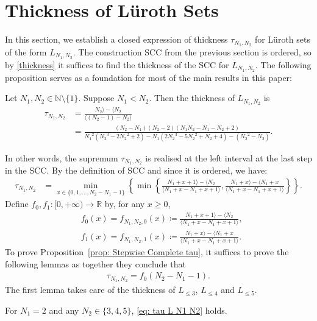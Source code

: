 \documentclass{ws-ijnt}
\begin{document}
	\section{Thickness of L\"uroth Sets}\label{section: thickness}
	In this section, we establish a closed expression of thickness $\tau_{N_1,N_2}$ for L\"uroth sets of the form $L_{N_1,N_2}$. The construction SCC from the previous section is ordered, so by \eqref{thickness} it suffices to find the thickness of the SCC for $L_{N_1,N_2}$. The following proposition serves as a foundation for most of the main results in this paper:
	\begin{proposition}\label{prop: Stepwise Complete tau}
		Let $N_1,N_2\in\mathbb{N}\setminus\{1\}$. Suppose $N_1<N_2$. Then the thickness of $L_{N_1,N_2}$ is
		\begin{align}
			\label{eq: tau L N1 N2}
			\tau_{N_1,N_2}
			&=\frac{N_2\rangle-\langle N_2}{\langle(N_2-1)-N_2\rangle} \\
			&=\frac{(N_2-N_1)(N_2-2)(N_1N_2-N_1-N_2+2)}{{N_1}^2({N_2}^3-2{N_2}^2+2)-{N_1}(2{N_2}^3-5{N_2}^2+{N_2}+4)-({N_2}^2-{N_2})} \nonumber
			.
		\end{align}
	\end{proposition}
	In other words, the supremum $\tau_{N_1,N_2}$ is realised at the left interval at the last step in the SCC. By the definition of SCC and since it is ordered, we have:
	\begin{align*}
		\tau_{N_1,N_2}
		&=\min_{x\in\{0,1,\ldots,N_2-N_1-1\}}{\left\{\min{\left\{
				\frac{N_1+x+1\rangle-\langle N_2}{\langle N_1+x-N_1+x+1\rangle}
				,
				\frac{N_1+x\rangle-\langle N_1+x}{\langle N_1+x-N_1+x+1\rangle}
				\right\}}\right\}}.
	\end{align*}
	Define $f_0,f_1:[0,+\infty)\to\mathbb{R}$ by, for any $x\geq0$, 
	\begin{align*}
		&f_0(x)=f_{N_1,N_2,0}(x)
		\coloneqq \frac{N_1+x+1\rangle-\langle N_2}{\langle N_1+x-N_1+x+1\rangle}, \\
		&f_1(x)=f_{N_1,N_2,1}(x)
		\coloneqq \frac{N_1+x\rangle-\langle N_1+x}{\langle N_1+x-N_1+x+1\rangle}.
	\end{align*}
	To prove Proposition~\ref{prop: Stepwise Complete tau}, it suffices to prove the following lemmas as together they conclude that
	\begin{align*}
		\tau_{N_1,N_2}=f_0(N_2-N_1-1).
	\end{align*}
	The first lemma takes care of the thickness of $L_{\leq 3}$, $L_{\leq 4}$ and $L_{\leq 5}$.
	\begin{lemma}\label{lemma: tau A}
		For $N_1=2$ and any $N_2\in\{3,4,5\}$, \eqref{eq: tau L N1 N2} holds.
	\end{lemma}
\end{document}
